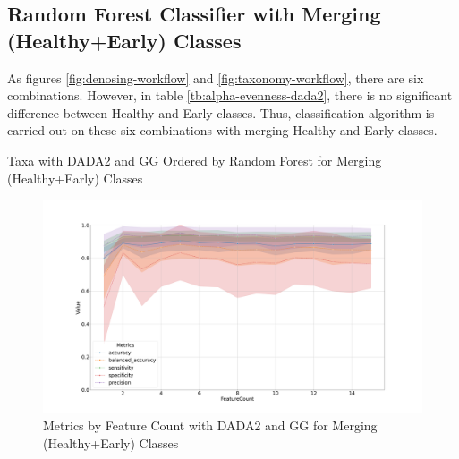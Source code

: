 \documentclass[a4paper]{article}
\begin{document}
        \subsection{Random Forest Classifier with Merging (Healthy+Early) Classes}
            As figures \ref{fig:denosing-workflow} and \ref{fig:taxonomy-workflow}, there are six combinations. However, in table \ref{tb:alpha-evenness-dada2}, there is no significant difference between Healthy and Early classes. Thus, classification algorithm is carried out on these six combinations with merging Healthy and Early classes.

            \begin{table}[p]
                \centering
                \caption{Taxa with DADA2 and GG Ordered by Random Forest for Merging (Healthy+Early) Classes}
                \label{tb:RF-HE-DADA2-gg}

            \end{table}

            \begin{figure}[p]
                \centering
                \includegraphics[width=0.7 \linewidth]{figures/RandomForest/one.DADA2.gg/metrics.png}
                \caption{Metrics by Feature Count with DADA2 and GG for Merging (Healthy+Early) Classes}
                \label{fig:RF-HE-metrics-DADA2-gg}
            \end{figure}
\end{document}

